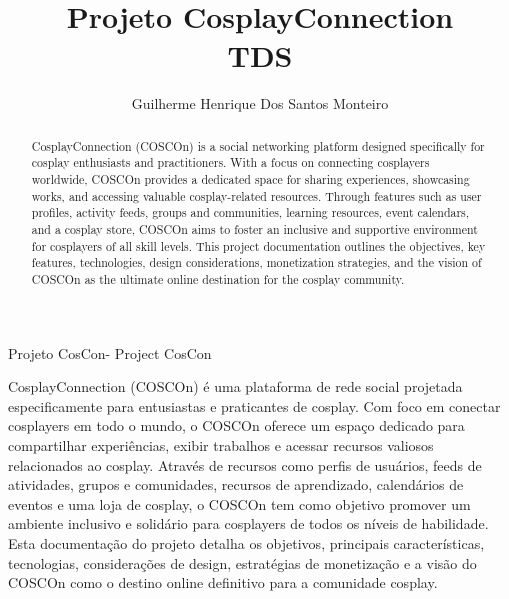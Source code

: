 \documentclass[12pt,a4paper,chapter=TITLE,section=TITLE,subsection=TITLE,subsubsection=TITLE]{article}
\title{Projeto CosplayConnection\\ TDS }
\author{Guilherme Henrique Dos Santos Monteiro\inst{1} }
\begin{document}
  


\frenchspacing 


%
%

\maketitle
Projeto CosCon-
Project CosCon

\begin{abstract}
  CosplayConnection (COSCOn) is a social networking platform designed specifically for cosplay enthusiasts and practitioners. With a focus on connecting cosplayers worldwide, COSCOn provides a dedicated space for sharing experiences, showcasing works, and accessing valuable cosplay-related resources. Through features such as user profiles, activity feeds, groups and communities, learning resources, event calendars, and a cosplay store, COSCOn aims to foster an inclusive and supportive environment for cosplayers of all skill levels. This project documentation outlines the objectives, key features, technologies, design considerations, monetization strategies, and the vision of COSCOn as the ultimate online destination for the cosplay community.
\end{abstract}
     
\begin{resumo1} 
  CosplayConnection (COSCOn) é uma plataforma de rede social projetada especificamente para entusiastas e praticantes de cosplay. Com foco em conectar cosplayers em todo o mundo, o COSCOn oferece um espaço dedicado para compartilhar experiências, exibir trabalhos e acessar recursos valiosos relacionados ao cosplay. Através de recursos como perfis de usuários, feeds de atividades, grupos e comunidades, recursos de aprendizado, calendários de eventos e uma loja de cosplay, o COSCOn tem como objetivo promover um ambiente inclusivo e solidário para cosplayers de todos os níveis de habilidade. Esta documentação do projeto detalha os objetivos, principais características, tecnologias, considerações de design, estratégias de monetização e a visão do COSCOn como o destino online definitivo para a comunidade cosplay.
\end{resumo1}
\end{document}
